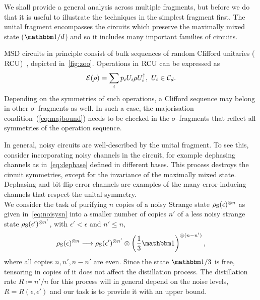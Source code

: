\documentclass[pra,
aps,
twocolumn,
superscriptaddress,
groupedaddress,
nofootinbib,
reprint
]{revtex4-1}
\begin{document}
\label{sec:unital}
We shall provide a general analysis across multiple fragments, but before we do that it is useful to illustrate the techniques in the simplest fragment first. The unital fragment encompasses the circuits which preserve the maximally mixed state ($\id/d$) and so it includes many important families of circuits.

MSD circuits in principle consist of bulk sequences of random Clifford unitaries (${\rm{RCU}}$)~\cite{cit:bravyi}, depicted in~\cref{fig:zoo}.
Operations in ${\rm{RCU}}$ can be expressed as
\begin{equation}
    \mathcal{E}(\rho) = \sum_i p_i U_i \rho U_i^\dagger,\ U_i \in \mathcal{C}_d.
\end{equation}
Depending on the symmetries of such operations, a Clifford sequence may belong in other $\sigma$--fragments as well.
In such a case, the majorisation condition~(\ref{eq:majbound}) needs to be checked in the $\sigma$--fragments that reflect all symmetries of the operation sequence.

In general, noisy circuits are well-described by the unital fragment.
To see this, consider incorporating noisy channels in the circuit, for example dephasing channels as in~\cref{eq:dephase} defined in different bases.
This process destroys the circuit symmetries, except for the invariance of the maximally mixed state.
Dephasing and bit-flip error channels are examples of the many error-inducing channels that respect the unital symmetry. 
\null\\

We consider the task of purifying $n$ copies of a noisy Strange state $\rho_{\rm{S}}(\epsilon)^{\otimes n}$ as given in~\cref{eq:noisysn} into a smaller number of copies $n'$ of a less noisy strange state $\rho_{\rm{S}}(\epsilon')^{\otimes n'}$, with $\epsilon' < \epsilon$ and $n' \leq n$,
\begin{equation}\label{eq:sudist}
	\rho_{\rm{S}}(\epsilon)^{\otimes n} \longrightarrow \rho_{\rm{S}}(\epsilon')^{\otimes n'} \otimes \left( \frac{1}{3}\id \right)^{\otimes (n-n')},
\end{equation}
where all copies $n, n', n - n'$ are even.
Since the state $\id / 3$ is free, tensoring in copies of it does not affect the distillation process.
The distillation rate $R \coloneqq n'/n$ for this process will in general depend on the noise levels, $R = R(\epsilon, \epsilon')$ and our task is to provide it with an upper bound.
\end{document}
